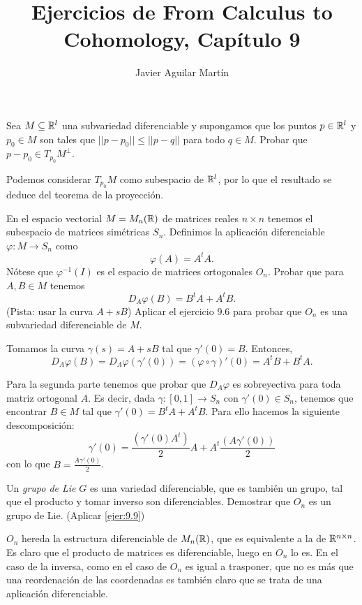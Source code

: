 \documentclass[twoside]{article}
\begin{document}
\title{Ejercicios de From Calculus to Cohomology, Capítulo 9}
\author{Javier Aguilar Martín}
\maketitle

\begin{ejercicio}{9.1}
Sea $M\subseteq\mathbb{R}^l$ una subvariedad diferenciable y supongamos que los puntos $p\in\mathbb{R}^l$ y $p_0\in M$ son tales que $||p-p_0||\leq ||p-q||$ para todo $q\in M$. Probar que $p-p_0\in T_{p_0}M^{\perp}$.
\end{ejercicio}
\begin{solucion}
Podemos considerar $T_{p_0}M$ como subespacio de $\mathbb{R}^l$, por lo que el resultado se deduce del teorema de la proyección. 
\end{solucion}
\newpage


\begin{ejercicio}{9.9}
En el espacio vectorial $M=M_n(\mathbb{R})$ de matrices reales $n\times n$ tenemos el subespacio de matrices simétricas $S_n$. Definimos la aplicación diferenciable $\varphi:M\to S_n$ como 
\[
\varphi(A)=A^tA.
\]
Nótese que $\varphi^{-1}(I)$ es el espacio de matrices ortogonales $O_n$. Probar que para $A,B\in M$ tenemos
\[
D_A\varphi(B)=B^tA+A^tB.
\]
(Pista: usar la curva $A+sB$)
Aplicar el ejercicio 9.6 para probar que $O_n$ es una subvariedad diferenciable de $M$.
\end{ejercicio}
\begin{solucion}
Tomamos la curva $\gamma(s)=A+sB$ tal que $\gamma'(0)=B$. Entonces, 
\[
D_A\varphi(B)=D_A\varphi(\gamma'(0))=(\varphi\circ\gamma)'(0)=A^tB+B^tA.
\]

Para la segunda parte tenemos que probar que $D_A\varphi$ es sobreyectiva para toda matriz ortogonal $A$. Es decir, dada $\gamma:[0,1]\to S_n$ con $\gamma'(0)\in S_n$, tenemos que encontrar $B\in M$ tal que $\gamma'(0)=B^tA+A^tB$. Para ello hacemos la siguiente descomposición:
\[
\gamma'(0)=\frac{(\gamma'(0)A^t)}{2}A+A^t\frac{(A\gamma'(0))}{2}
\]
con lo que $B=\frac{A\gamma'(0)}{2}$.
\end{solucion}
\newpage

\begin{ejercicio}{9.10}
Un \emph{grupo de Lie} $G$ es una variedad diferenciable, que es también un grupo, tal que el producto y tomar inverso son diferenciables. Demostrar que $O_n$ es un grupo de Lie. (Aplicar \ref{ejer:9.9})
\end{ejercicio}
\begin{solucion}
$O_n$ hereda la estructura diferenciable de $M_n(\mathbb{R})$, que es equivalente a la de $\mathbb{R}^{n\times n}$. Es claro que el producto de matrices es diferenciable, luego en $O_n$ lo es. En el caso de la inversa, como en el caso de $O_n$ es igual a trasponer, que no es más que una reordenación de las coordenadas es también claro que se trata de una aplicación diferenciable.
\end{solucion}
\newpage
\end{document}
